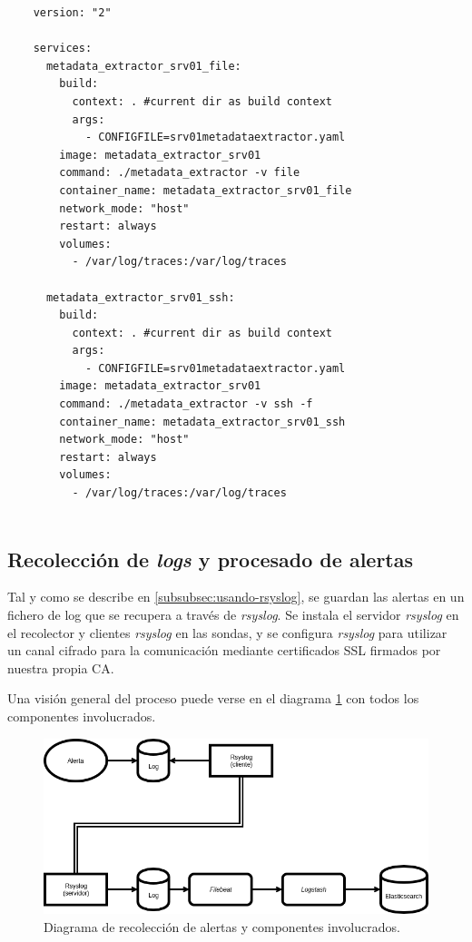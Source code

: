 \begin{verbatim}
    version: "2"
    
    services:
      metadata_extractor_srv01_file:
        build:
          context: . #current dir as build context
          args:
            - CONFIGFILE=srv01metadataextractor.yaml
        image: metadata_extractor_srv01
        command: ./metadata_extractor -v file
        container_name: metadata_extractor_srv01_file
        network_mode: "host"
        restart: always
        volumes:
          - /var/log/traces:/var/log/traces
         
      metadata_extractor_srv01_ssh:
        build:
          context: . #current dir as build context
          args:
            - CONFIGFILE=srv01metadataextractor.yaml
        image: metadata_extractor_srv01
        command: ./metadata_extractor -v ssh -f
        container_name: metadata_extractor_srv01_ssh
        network_mode: "host"
        restart: always
        volumes:
          - /var/log/traces:/var/log/traces
         
\end{verbatim}
\bigskip

\subsection{Recolección de \emph{logs} y procesado de alertas}

Tal y como se describe en \ref{subsubsec:usando-rsyslog}, se guardan las alertas en un fichero de log que se recupera a través de
\emph{rsyslog}. 
Se instala el servidor \emph{rsyslog} en el recolector y clientes \emph{rsyslog} en las sondas, y se configura \emph{rsyslog}
para utilizar un canal cifrado para la comunicación mediante certificados SSL firmados por nuestra propia CA.

Una visión general del proceso puede verse en el diagrama \ref{fig:alert-log-architecture} con todos los componentes involucrados.

\begin{figure}[htp]
    \centering
    \includegraphics[scale=0.4]{images/AlertasEnvioLog}
    \caption{Diagrama de recolección de alertas y componentes involucrados.}
    \label{fig:alert-log-architecture}
\end{figure}

